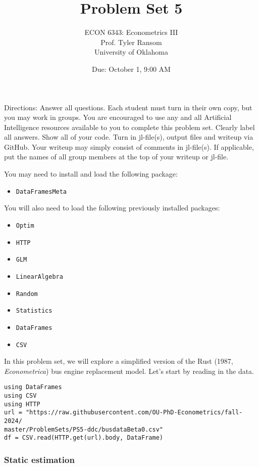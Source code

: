 \documentclass[12pt,english]{article}
\begin{document}
\title{Problem Set 5}
\author{ECON 6343: Econometrics III\\
Prof. Tyler Ransom\\
University of Oklahoma}
\date{Due: October 1, 9:00 AM}

\maketitle
Directions: Answer all questions. Each student must turn in their own copy, but you may work in groups. You are encouraged to use any and all Artificial Intelligence resources available to you to complete this problem set. Clearly label all answers. Show all of your code. Turn in jl-file(s), output files and writeup via GitHub. Your writeup may simply consist of comments in jl-file(s). If applicable, put the names of all group members at the top of your writeup or jl-file.

You may need to install and load the following package:
\begin{itemize}
    \item[~] \texttt{DataFramesMeta}
\end{itemize}

You will also need to load the following previously installed packages:
\begin{itemize}
    \item[~] \texttt{Optim} 
    \item[~] \texttt{HTTP} 
    \item[~] \texttt{GLM} 
    \item[~] \texttt{LinearAlgebra} 
    \item[~] \texttt{Random} 
    \item[~] \texttt{Statistics} 
    \item[~] \texttt{DataFrames} 
    \item[~] \texttt{CSV} 
\end{itemize}
\pagebreak
In this problem set, we will explore a simplified version of the Rust (1987, \textit{Econometrica}) bus engine replacement model. Let's start by reading in the data.

\begin{verbatim}
using DataFrames
using CSV
using HTTP
url = "https://raw.githubusercontent.com/OU-PhD-Econometrics/fall-2024/
master/ProblemSets/PS5-ddc/busdataBeta0.csv"
df = CSV.read(HTTP.get(url).body, DataFrame)
\end{verbatim}


\subsubsection*{Static estimation}
\end{document}
